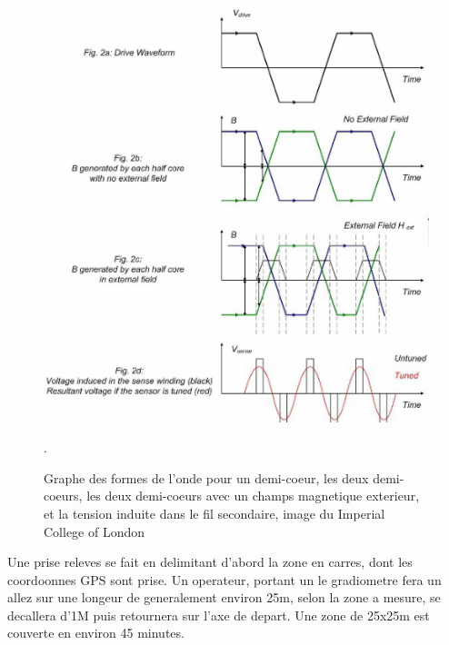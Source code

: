\documentclass[a4paper, 12pt, titlepage, oneside, french]{article}
\begin{document}
\begin{figure}[H]
		\centering
		\includegraphics[width=\textwidth, height=0.9\textheight, keepaspectratio]{FluxgatePlot.jpg}
		\caption{Graphe des formes de l'onde pour un demi-coeur, les deux demi-coeurs, les deux demi-coeurs avec un champs magnetique exterieur, et la tension induite dans le fil secondaire, image du Imperial College of London}. 
		\label{fig:FluxPlot}
\end{figure}

		Une prise releves se fait en delimitant d'abord la zone en carres, dont les coordoonnes GPS sont prise. Un operateur, portant un le gradiometre fera un allez sur une longeur de generalement environ 25m, selon la zone a mesure, se decallera d'1M puis retournera sur l'axe de depart. Une zone de 25x25m est couverte en environ 45 minutes.
\end{document}
